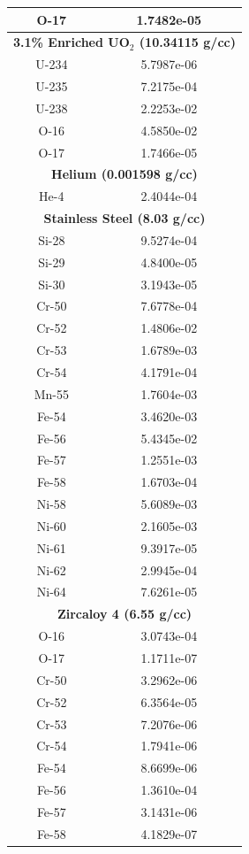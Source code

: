 \begin{table}[h!]
\begin{tabular}{c c}
  O-17 & 1.7482e-05 \\
  \midrule
  \multicolumn{2}{c}{\bf 3.1\% Enriched UO$_2$ (10.34115 g/cc)} \\
  \midrule
  U-234 & 5.7987e-06 \\
  U-235 & 7.2175e-04 \\
  U-238 & 2.2253e-02 \\
  O-16 & 4.5850e-02 \\
  O-17 & 1.7466e-05 \\
  \midrule
  \multicolumn{2}{c}{\bf Helium (0.001598 g/cc)} \\
  \midrule
  He-4 & 2.4044e-04 \\
  \midrule
  \multicolumn{2}{c}{\bf Stainless Steel (8.03 g/cc)} \\
  \midrule
  Si-28 & 9.5274e-04 \\
  Si-29 & 4.8400e-05 \\
  Si-30 & 3.1943e-05 \\
  Cr-50 & 7.6778e-04 \\
  Cr-52 & 1.4806e-02 \\
  Cr-53 & 1.6789e-03 \\
  Cr-54 & 4.1791e-04 \\
  Mn-55 & 1.7604e-03 \\
  Fe-54 & 3.4620e-03 \\
  Fe-56 & 5.4345e-02 \\
  Fe-57 & 1.2551e-03 \\
  Fe-58 & 1.6703e-04 \\
  Ni-58 & 5.6089e-03 \\
  Ni-60 & 2.1605e-03 \\
  Ni-61 & 9.3917e-05 \\
  Ni-62 & 2.9945e-04 \\
  Ni-64 & 7.6261e-05 \\
  \midrule
  \multicolumn{2}{c}{\bf Zircaloy 4 (6.55 g/cc)} \\
  \midrule
  O-16 & 3.0743e-04 \\
  O-17 & 1.1711e-07 \\
  Cr-50 & 3.2962e-06 \\
  Cr-52 & 6.3564e-05 \\
  Cr-53 & 7.2076e-06 \\
  Cr-54 & 1.7941e-06 \\
  Fe-54 & 8.6699e-06 \\
  Fe-56 & 1.3610e-04 \\
  Fe-57 & 3.1431e-06 \\
  Fe-58 & 4.1829e-07 \\

\end{tabular}
\end{table}
